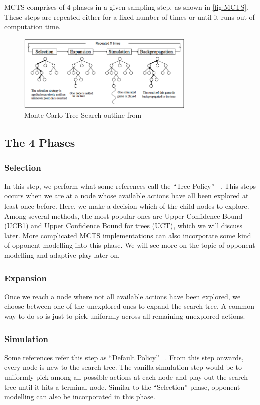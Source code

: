 \documentclass[11pt, a4paper, oneside]{article}
\begin{document}
MCTS comprises of 4 phases in a given sampling step, as shown in \autoref{fig:MCTS}. These steps are repeated either for a fixed number of times or until it runs out of computation time.

\begin{figure}[H]
	\centering
	\includegraphics[width=0.75\textwidth]{MCTS_outline.png}
	\caption{Monte Carlo Tree Search outline from ~\cite{Chaslot2010}}
	\label{fig:MCTS}
\end{figure}

\subsection{The 4 Phases}
\subsubsection{Selection}
In this step, we perform what some references call the ``Tree Policy'' ~\cite{Browne2012}. This steps occurs when we are at a node whose available actions have all been explored at least once before. Here, we make a decision which of the child nodes to explore. Among several methods, the most popular ones are Upper Confidence Bound (UCB1) and Upper Confidence Bound for trees (UCT), which we will discuss later. More complicated MCTS implementations can also incorporate some kind of opponent modelling into this phase. We will see more on the topic of opponent modelling and adaptive play later on.

\subsubsection{Expansion}
Once we reach a node where not all available actions have been explored, we choose between one of the unexplored ones to expand the search tree. A common way to do so is just to pick uniformly across all remaining unexplored actions.

\subsubsection{Simulation}
Some references refer this step as ``Default Policy'' ~\cite{Browne2012}. From this step onwards, every node is new to the search tree. The vanilla simulation step would be to uniformly pick among all possible actions at each node and play out the search tree until it hits a terminal node. Similar to the ``Selection'' phase, opponent modelling can also be incorporated in this phase.
\end{document}

